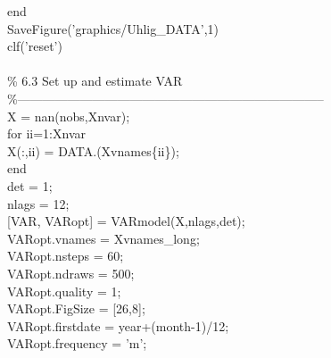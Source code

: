\hspace{1mm}\textcolor{matlabblue}{end} \\ 
\hspace{1mm}SaveFigure(\textcolor{matlabpurple}{'graphics/Uhlig\_DATA'},1) \\ 
\hspace{1mm}clf(\textcolor{matlabpurple}{'reset'}) \\ 
\hspace{1mm} \\ 
\hspace{1mm}\textcolor{matlabgreen}{\% 6.3 Set up and estimate VAR }\\ 
\hspace{1mm}\textcolor{matlabgreen}{\%--------------------------------------------------------------------------  }\\ 
\hspace{1mm}X = nan(nobs,Xnvar); \\ 
\hspace{1mm}\textcolor{matlabblue}{for} ii=1:Xnvar \\ 
\hspace{1mm}\hspace{5mm} X(:,ii) = DATA.(Xvnames\{ii\}); \\ 
\hspace{1mm}\textcolor{matlabblue}{end} \\ 
\hspace{1mm}det = 1; \\ 
\hspace{1mm}nlags = 12; \\ 
\hspace{1mm}[VAR, VARopt] = VARmodel(X,nlags,det); \\ 
\hspace{1mm}VARopt.vnames = Xvnames\_long; \\ 
\hspace{1mm}VARopt.nsteps = 60; \\ 
\hspace{1mm}VARopt.ndraws = 500; \\ 
\hspace{1mm}VARopt.quality = 1; \\ 
\hspace{1mm}VARopt.FigSize = [26,8]; \\ 
\hspace{1mm}VARopt.firstdate = year+(month-1)/12; \\ 
\hspace{1mm}VARopt.frequency = \textcolor{matlabpurple}{'m'}; \\ 
